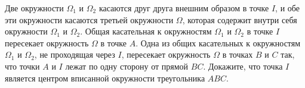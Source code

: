 \begin{tcolorbox}[
    enhanced,
    breakable,
    colback=gray!10,
    colframe=green!70!black,
    colbacktitle=green!85!black,
    coltitle=black,
    fonttitle=\bfseries,
    title= Пример 3. Версия на русском,
    boxrule=0.8pt,
    arc=2mm
]

Две окружности $\Omega_1$ и $\Omega_2$ касаются друг друга внешним образом в точке $I$, и обе эти окружности касаются третьей окружности $\Omega$, которая содержит внутри себя окружности $\Omega_1$ и $\Omega_2$. Общая касательная к окружностям $\Omega_1$ и $\Omega_2$ в точке $I$ пересекает окружность $\Omega$ в точке $A$. Одна из общих касательных к окружностям $\Omega_1$ и $\Omega_2$, не проходящая через $I$, пересекает окружность $\Omega$ в точках $B$ и $C$ так, что точки $A$ и $I$ лежат по одну сторону от прямой $B C$. Докажите, что точка $I$ является центром вписанной окружности треугольника $A B C$.

\end{tcolorbox}

\newpage

\hspace{3mm}

